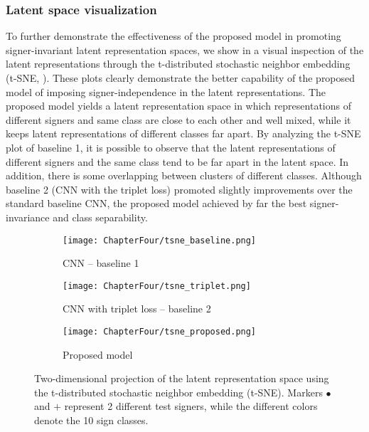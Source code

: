\subsubsection{Latent space visualization}
To further demonstrate the effectiveness of the proposed model in promoting signer-invariant latent representation spaces, we show in  a visual inspection of the latent representations through the t-distributed stochastic neighbor embedding (t-SNE, \citet{Maaten2008}). These plots clearly demonstrate the better capability of the proposed model of imposing signer-independence in the latent representations. The proposed model yields a latent representation space in which representations of different signers and same class are close to each other and well mixed, while it keeps latent representations of different classes far apart. By analyzing the t-SNE plot of baseline 1, it is possible to observe that the latent representations of different signers and the same class tend to be far apart in the latent space. In addition, there is some overlapping between clusters of different classes. Although baseline 2 (CNN with the triplet loss) promoted slightly improvements over the standard baseline CNN, the proposed model achieved by far the best signer-invariance and class separability.

\begin{figure}
    \centering
    \begin{subfigure}[t]{0.32\textwidth}
        \texttt{[image: ChapterFour/tsne\_baseline.png]}
        \caption{CNN -- baseline 1}
        \label{fig:adv_signer_inv_tsne_a}
    \end{subfigure}
    \begin{subfigure}[t]{0.32\textwidth}
        \texttt{[image: ChapterFour/tsne\_triplet.png]}
        \caption{CNN with triplet loss -- baseline 2}
        \label{fig:adv_signer_inv_tsne_b}
    \end{subfigure}
    \begin{subfigure}[t]{0.32\textwidth}
        \texttt{[image: ChapterFour/tsne\_proposed.png]}
        \caption{Proposed model}
        \label{fig:adv_signer_inv_tsne_c}
    \end{subfigure}
    \caption{\centering Two-dimensional projection of the latent representation space using the t-distributed stochastic neighbor embedding (t-SNE). Markers $\bullet$ and $\textbf{+}$ represent 2 different test signers, while the different colors denote the 10 sign classes.}
    \label{fig:adv_signer_inv_tsne}
\end{figure}

